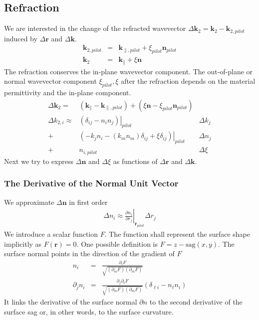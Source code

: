 \documentclass[12pt,a4paper,twoside,openright,BCOR10mm,headsepline,titlepage,abstracton,chapterprefix,final]{scrreprt}
\newcommand\Vector[1]{{\mathbf{#1}}}
\newcommand\wavenumber{k}
\newcommand\Wavevector{\Vector{\wavenumber}}
\begin{document}
\subsection{Refraction}

We are interested in the change of the refracted wavevector $\Delta\Wavevector_2 = {\Wavevector}_2 - \Wavevector_{2, pilot}$ induced by $\Delta\Vector{r}$ and $\Delta\Wavevector$.
\begin{eqnarray}
 \Wavevector_{2, pilot} &=& \Wavevector_{\parallel, pilot} + \xi_{pilot} \Vector{n}_{pilot} 
 \\
 {\Wavevector}_2 &=& {\Wavevector}_{\parallel} + {\xi} {\Vector{n}} 
\end{eqnarray}
The refraction conserves the in-plane wavevector component. 
The out-of-plane or normal wavevector component $\xi_{pilot}, {\xi}$ after the refraction depends on the material permittivity and the in-plane component.
\begin{eqnarray}
 \Delta\Wavevector_2 =& ( {\Wavevector}_{\parallel} - \Wavevector_{\parallel, pilot} ) + ( {\xi} {\Vector{n}} - \xi_{pilot} \Vector{n}_{pilot} )&
\\[2ex]
 \Delta \wavenumber_{2,i} \approx&
   \left.
     \left( \delta_{ij}  - n_{i} n_{j} \right)
   \right|_{pilot}
   &\Delta\wavenumber_j
   \nonumber\\
   +&
   \left.
   \left(
     - \wavenumber_{j}  n_{i} 
     - (\wavenumber_{m} n_{m}) \delta_{ij}  
     + \xi \delta_{ij}
   \right) 
   \right|_{pilot}
   &\Delta n_{j}
   \nonumber \\
   +& n_{i, pilot} &\Delta\xi 
\end{eqnarray}
Next we try to express $\Delta\Vector{n}$ and $\Delta\xi$ as functions of $\Delta\Vector{r}$ and $\Delta\Wavevector$.


\subsubsection{The Derivative of the Normal Unit Vector}
We approximate $\Delta\Vector{n}$ in first order
\begin{eqnarray}
 \Delta n_i \approx \left. \frac{\partial n_i}{\partial r_j} \right|_{\Vector{r}_{pilot}} \Delta r_j
\end{eqnarray}
We introduce a scalar function $F$. The function shall represent the surface shape implicitly as $F(\Vector{r}) = 0$. 
One possible definition is $F = z - \textrm{sag}(x,y)$. The surface normal points in the direction of the gradient of $F$
\begin{eqnarray}
 n_i &=& \frac{\partial_i F}{\sqrt{(\partial_m F)(\partial_m F)}}
 \\
 \partial_j n_i &=& \frac{\partial_j \partial_\ell F}{\sqrt{(\partial_m F)(\partial_m F)}} \left(\delta_{\ell i} - n_\ell n_i\right)
 \label{eq:nderivative}
\end{eqnarray}
It links the derivative of the surface normal $\partial n$ to the second derivative of the surface sag 
or, in other words, to the surface curvature.
\end{document}
